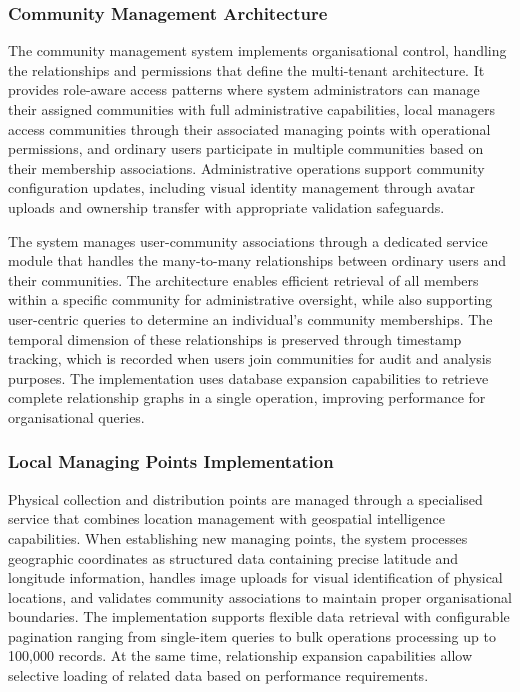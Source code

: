 \subsubsection{Community Management Architecture}

The community management system implements organisational control, handling the relationships and permissions that define the multi-tenant architecture. It provides role-aware access patterns where system administrators can manage their assigned communities with full administrative capabilities, local managers access communities through their associated managing points with operational permissions, and ordinary users participate in multiple communities based on their membership associations. Administrative operations support community configuration updates, including visual identity management through avatar uploads and ownership transfer with appropriate validation safeguards.

The system manages user-community associations through a dedicated service module that handles the many-to-many relationships between ordinary users and their communities. The architecture enables efficient retrieval of all members within a specific community for administrative oversight, while also supporting user-centric queries to determine an individual's community memberships. The temporal dimension of these relationships is preserved through timestamp tracking, which is recorded when users join communities for audit and analysis purposes. The implementation uses database expansion capabilities to retrieve complete relationship graphs in a single operation, improving performance for organisational queries.

\subsubsection{Local Managing Points Implementation}

Physical collection and distribution points are managed through a specialised service that combines location management with geospatial intelligence capabilities. When establishing new managing points, the system processes geographic coordinates as structured data containing precise latitude and longitude information, handles image uploads for visual identification of physical locations, and validates community associations to maintain proper organisational boundaries. The implementation supports flexible data retrieval with configurable pagination ranging from single-item queries to bulk operations processing up to 100,000 records. At the same time, relationship expansion capabilities allow selective loading of related data based on performance requirements.

